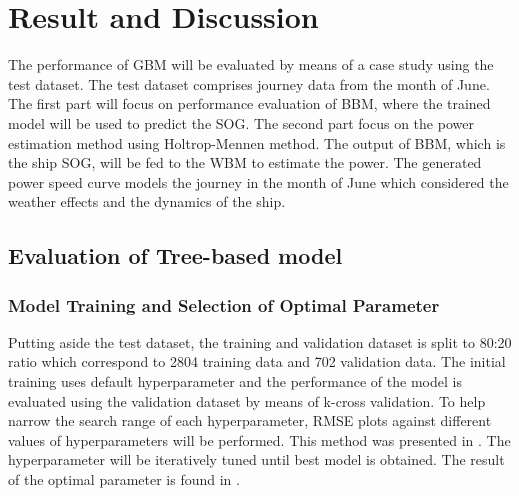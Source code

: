\chapter{Result and Discussion} \label{chp:result}

The performance of GBM will be evaluated by means of a case study using the test dataset. The test dataset comprises journey data from the month of June. The first part will focus on performance evaluation of BBM, where the trained model will be used to predict the SOG. The second part focus on the power estimation method using Holtrop-Mennen method. The output of BBM, which is the ship SOG, will be fed to the WBM to estimate the power. The generated power speed curve models the journey in the month of June which considered the weather effects and the dynamics of the ship.

\section{Evaluation of Tree-based model}\label{sec:BBM_tree_evaluate}

\subsection*{Model Training and Selection of Optimal Parameter}\label{sec:hpo_select_train}

Putting aside the test dataset, the training and validation dataset is split to 80:20 ratio which correspond to 2804 training data and 702 validation data. The initial training uses default hyperparameter and the performance of the model is evaluated using the validation dataset by means of k-cross validation. To help narrow the search range of each hyperparameter, RMSE plots against different values of hyperparameters will be performed. This method was presented in . The hyperparameter will be iteratively tuned until best model is obtained. The result of the optimal parameter is found in .


